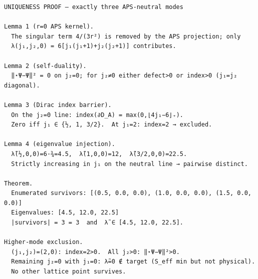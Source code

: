 \documentclass{article}
\begin{document}
\begin{verbatim}
UNIQUENESS PROOF — exactly three APS-neutral modes

Lemma 1 (r=0 APS kernel).
  The singular term 4/(3r²) is removed by the APS projection; only
  λ(j₁,j₂,0) = 6[j₁(j₁+1)+j₂(j₂+1)] contributes.

Lemma 2 (self-duality).
  ‖⋆Ψ−Ψ‖² = 0 on j₂=0; for j₂≠0 either defect>0 or index>0 (j₁=j₂ diagonal).

Lemma 3 (Dirac index barrier).
  On the j₂=0 line: index(∂D_A) = max(0,⌊4j₁−6⌋₊).
  Zero iff j₁ ∈ {½, 1, 3/2}.  At j₁=2: index=2 → excluded.

Lemma 4 (eigenvalue injection).
  λ̃(½,0,0)=6·¾=4.5,  λ̃(1,0,0)=12,  λ̃(3/2,0,0)=22.5.
  Strictly increasing in j₁ on the neutral line → pairwise distinct.

Theorem.
  Enumerated survivors: [(0.5, 0.0, 0.0), (1.0, 0.0, 0.0), (1.5, 0.0, 0.0)]
  Eigenvalues: [4.5, 12.0, 22.5]
  |survivors| = 3 = 3  and  λ̃ ∈ [4.5, 12.0, 22.5].

Higher-mode exclusion.
  (j₁,j₂)=(2,0): index=2>0.  All j₂>0: ‖⋆Ψ−Ψ‖²>0.
  Remaining j₂=0 with j₁=0: λ̃=0 ∉ target (S_eff min but not physical).
  No other lattice point survives.
\end{verbatim}
\end{document}
